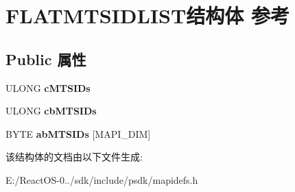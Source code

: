 \hypertarget{struct_f_l_a_t_m_t_s_i_d_l_i_s_t}{}\section{F\+L\+A\+T\+M\+T\+S\+I\+D\+L\+I\+S\+T结构体 参考}
\label{struct_f_l_a_t_m_t_s_i_d_l_i_s_t}
\subsection*{Public 属性}
\begin{DoxyCompactItemize}
\item 
\mbox{\label{struct_f_l_a_t_m_t_s_i_d_l_i_s_t_aca6db4416142531e539afa8c98c72933}} 
U\+L\+O\+NG {\bfseries c\+M\+T\+S\+I\+Ds}
\item 
\mbox{\label{struct_f_l_a_t_m_t_s_i_d_l_i_s_t_ac37197ef8aa8d562653491e5299caafb}} 
U\+L\+O\+NG {\bfseries cb\+M\+T\+S\+I\+Ds}
\item 
\mbox{\label{struct_f_l_a_t_m_t_s_i_d_l_i_s_t_a013545320f555bec020b15de6c5345e0}} 
B\+Y\+TE {\bfseries ab\+M\+T\+S\+I\+Ds} \mbox{[}M\+A\+P\+I\+\_\+\+D\+IM\mbox{]}
\end{DoxyCompactItemize}


该结构体的文档由以下文件生成\+:\begin{DoxyCompactItemize}
\item 
E\+:/\+React\+O\+S-\/0../sdk/include/psdk/mapidefs.\+h\end{DoxyCompactItemize}
